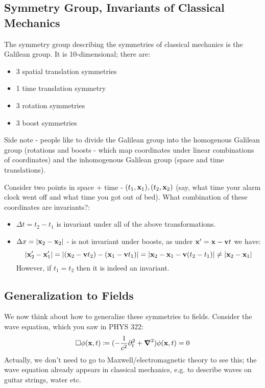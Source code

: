 \subsection{Symmetry Group, Invariants of Classical Mechanics}
The symmetry group describing the symmetries of classical mechanics is the Galilean group. It is 10-dimensional; there are:
\begin{itemize}
    \item 3 spatial translation symmetries
    \item 1 time translation symmetry
    \item 3 rotation symmetries
    \item 3 boost symmetries
\end{itemize}
Side note - people like to divide the Galilean group into the homogenous Galilean group (rotations and boosts - which map coordinates under linear combinations of coordinates) and the inhomogenous Galilean group (space and time translations).

Consider two points in space + time - $(t_1, \mathbf{x}_1), (t_2, \mathbf{x}_2)$ (say, what time your alarm clock went off and what time you got out of bed). What combination of these coordinates are invariants?:
\begin{itemize}
    \item $\Delta t = t_2 - t_1$ is invariant under all of the above transformations.
    \item $\Delta x = \lvert \mathbf{x}_2 - \mathbf{x}_2 \rvert$ - is not invariant under boosts, as under $\mathbf{x}' = \mathbf{x} - \mathbf{v}t$ we have:
    \begin{equation}
        \lvert \mathbf{x}_2' - \mathbf{x}_1' \rvert = \lvert (\mathbf{x}_2 - \mathbf{v}t_2) - (\mathbf{x}_1 - \mathbf{v}t_1) \rvert = \lvert \mathbf{x}_2 - \mathbf{x}_1 - \mathbf{v}(t_2 - t_1) \rvert \neq \lvert \mathbf{x}_2 - \mathbf{x}_1 \rvert
    \end{equation}
    However, if $t_1 = t_2$ then it is indeed an invariant.
\end{itemize}

\subsection{Generalization to Fields}
We now think about how to generalize these symmetries to fields. Consider the wave equation, which you saw in PHYS 322:
\begin{equation}\label{eq:waveeq}
    \square \phi(\v{x}, t) \coloneqq (-\frac{1}{c^2}\p_t^2 + \nabla^2)\phi(\v{x}, t) = 0
\end{equation}
Actually, we don't need to go to Maxwell/electromagnetic theory to see this; the wave equation already appears in classical mechanics, e.g. to describe waves on guitar strings, water etc.

